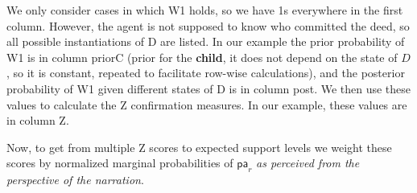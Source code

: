 \documentclass[10pt,]{scrartcl}
\newcommand{\s}[1]{\mbox{\textsf{#1}}}
\begin{document}
\begin{table}
\begin{table}[H]
\centering
{}
\end{table}
\caption{ECS calculation table for \s{W1} in the first scenario in the \s{Witness} problem.}
\label{t:w1}
\end{table}


 We only consider cases in which \textsf{W1} holds, so we have 1s everywhere in the first column. However, the agent is not supposed to know who committed the deed, so all possible instantiations of \textsf{D} are listed.   In our example the prior probability of \s{W1} is in column \textsf{priorC} (prior for the \textbf{child}, it does not depend on the state of $D$, so it is constant, repeated to facilitate row-wise calculations), and the posterior probability of \textsf{W1} given different states of \textsf{D} is in column \s{post}.  We then  use these values to calculate the \s{Z} confirmation measures. In our example, these values are in column \s{Z}. 
 
 
 Now, to get from multiple \s{Z} scores to expected support levels we weight these scores by normalized  marginal probabilities of \(\mathsf{pa}_r\) \emph{as perceived from the perspective of the narration}. 
 
\end{document}
